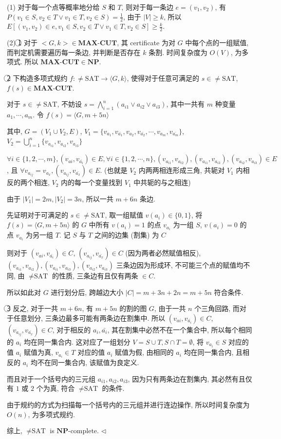 \documentclass[11pt]{article}
\newcommand{\NP}{\mathbf{NP}}
\newcommand{\NPC}{\mathbf{NP}\text{-complete}}
\newenvironment{answer}[1][Answer]{\begin{trivlist}
		\item[\hskip \labelsep {\bfseries #1.}\hskip \labelsep]}{\hfill$\lhd$\end{trivlist}}
\begin{document}
	\begin{answer}
		(1) 对于每一个点等概率地分给 $S$ 和 $T$, 则对于每一条边 $e=(v_1,v_2)$, 有 $P(v_1\in S,v_2\in T\vee v_1\in T,v_2\in S)=\frac{1}{2}$, 由于 $|V|\geq k$, 所以 $E[(v_1,v_2)\in e,v_1\in S,v_2\in T\vee v_1\in T,v_2\in S]\geq\frac{k}{2}$.
		
		(2) \textcircled{1} 对于 $<G,k>\in\textbf{MAX-CUT}$, 其 certificate 为对 $G$ 中每个点的一组赋值, 而判定机需要遍历每一条边, 并判断是否存在 $k$ 条割. 时间复杂度为 $O(V)$, 为多项式. 所以 $\textbf{MAX-CUT}\in \NP$.
		
		\textcircled{2} 下构造多项式规约 $f:\neq\text{SAT}\rightarrow \langle G,k\rangle$, 使得对于任意可满足的 $s\in\neq\text{SAT}$, $f(s)\in\textbf{MAX-CUT}$.
		
		对于 $s\in\neq\text{SAT}$, 不妨设 $s=\bigwedge\limits_{i=1}^{n}{(a_{i1}\vee a_{i2}\vee a_{i3})}$, 其中一共有 $m$ 种变量 $a_1,\cdots,a_m$. 令 $f(s)=\langle G,m+5n\rangle$
		
		其中, $G=(V_1\cup V_2,E)$, $V_1=\{v_{a_1},v_{\bar{a_1}},v_{a_2},v_{\bar{a_2}},\cdots,v_{a_m},v_{\bar{a_m}}\}$, $V_2=\bigcup\limits_{i=1}^{n}\{v_{a_{i1}},v_{a_{i2}},v_{a_{i3}}\}$
		
		$\forall i\in\{1,2,\cdots,m\},(v_{ai},v_{\bar{a_i}})\in E,\forall i\in\{1,2,\cdots,n\},(v_{a_{i1}},v_{a_{i2}}),(v_{a_{i1}},v_{a_{i3}}),(v_{a_{i2}},v_{a_{i3}})\in E$, 且 $\forall v_{a_{ij}}=v_{a_x}, (v_{a_{ij}},v_{\bar{a_x}})\in E$. (也就是 $V_2$ 内两两相连形成三角, 共轭对 $V_1$ 内相反的两个相连, $V_2$ 内的每一个变量找到 $V_1$ 中共轭的与之相连)
		
		由于 $|V_1|=2m,|V_2|=3n$, 所以一共 $m+6n$ 条边.
		
		先证明对于可满足的 $s\in\neq\text{SAT}$, 取一组赋值 $v(a_i)\in\{0,1\}$, 将 $f(s)=\langle G,m+5n\rangle$ 的 $G$ 中所有 $v(a_i)=1$ 的点 $v_{a_i}$ 为一组 $S$, $v(a_i)=0$ 的点 $v_{a_i}$ 为另一组 $T$. 记 $S$ 与 $T$ 之间的边集 (割集) 为 $C$
		
		则对于 $(v_{ai},v_{\bar{a_i}})\in C$, $(v_{a_{ij}},v_{\bar{a_x}})\in C$  (因为两者必然赋值相反), $(v_{a_{i1}},v_{a_{i2}}),(v_{a_{i1}},v_{a_{i3}}),(v_{a_{i2}},v_{a_{i3}})$ 三条边因为形成环, 不可能三个点的赋值均不同, 由 $\neq\text{SAT}$ 的性质, 三条边有且仅有两条 $\in C$.

		所以如此对 $G$ 进行划分后, 跨越边大小 $|C|=m+3n+2n=m+5n$ 符合条件.
		
		\textcircled{3} 反之, 对于一共 $m+6n$, 有 $m+5n$ 的割的图 $G$, 由于一共 $n$ 个三角回路, 而对于任意划分, 三条边最多可能有两条边在割集中. 所以 $(v_{ai},v_{\bar{a_i}})\in C$, $(v_{a_{ij}},v_{\bar{a_x}})\in C$, 对于相反的 $a_i,\bar{a_i}$, 其在割集中必然不在一个集合中, 所以每个相同的 $a_i$ 均在同一集合内. 这对应了一组划分 $V=S\cup T,S\cap T=\emptyset$, 将 $v_{a_i}\in S$ 对应的值 $a_i$ 赋值为真, $v_{a_i}\in T$ 对应的值 $a_i$ 赋值为假, 由相同的 $a_i$ 均在同一集合内, 且相反的 $a_i$ 均不在同一集合内, 该赋值为良定义.
		
		而且对于一个括号内的三元组 $a_{i1},a_{i2},a_{i3}$, 因为只有两条边在割集内, 其必然有且仅有 $1$ 或 $2$ 个为真, 符合 $\neq\text{SAT}$ 的条件.
		
		由于规约的方式为扫描每一个括号内的三元组并进行连边操作, 所以时间复杂度为 $O(n)$, 为多项式规约.
		
		综上, $\neq\text{SAT}$ is $\NPC$.
	\end{answer}
\end{document}
